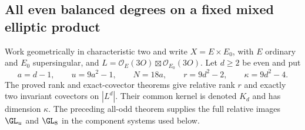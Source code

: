 \subsection{All even balanced degrees on a fixed mixed elliptic product}
\label{subsec:mixed-all-even-wreath-candidate}

Work geometrically in characteristic two and write
$X=E\times E_0$, with $E$ ordinary and $E_0$ supersingular, and
$L=\mathcal O_E(3O)\boxtimes\mathcal O_{E_0}(3O)$.
Let $d\geq2$ be even and put
\[
 a=d-1,\qquad u=9a^2-1,\qquad N=18a,\qquad
 r=9d^2-2,\qquad \kappa=9d^2-4.
\]
The proved rank and exact-covector theorems give relative rank $r$
and exactly two invariant covectors on $|L^d|$. Their common
kernel is denoted $K_d$ and has dimension $\kappa$.
The preceding all-odd theorem supplies the full relative images
$\GL_u$ and $\GL_8$ in the component systems used below.

